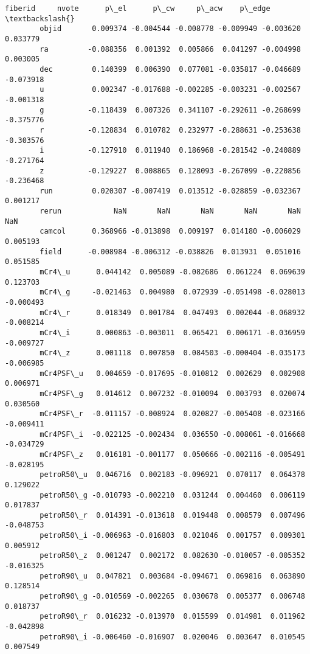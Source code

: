 \documentclass[11pt]{article}
\begin{document}
\begin{Verbatim}[commandchars=\\\{\}]
                     fiberid     nvote      p\_el      p\_cw     p\_acw    p\_edge  \textbackslash{}
        objid       0.009374 -0.004544 -0.008778 -0.009949 -0.003620  0.033779   
        ra         -0.088356  0.001392  0.005866  0.041297 -0.004998  0.003005   
        dec         0.140399  0.006390  0.077081 -0.035817 -0.046689 -0.073918   
        u           0.002347 -0.017688 -0.002285 -0.003231 -0.002567 -0.001318   
        g          -0.118439  0.007326  0.341107 -0.292611 -0.268699 -0.375776   
        r          -0.128834  0.010782  0.232977 -0.288631 -0.253638 -0.303576   
        i          -0.127910  0.011940  0.186968 -0.281542 -0.240889 -0.271764   
        z          -0.129227  0.008865  0.128093 -0.267099 -0.220856 -0.236468   
        run         0.020307 -0.007419  0.013512 -0.028859 -0.032367  0.001217   
        rerun            NaN       NaN       NaN       NaN       NaN       NaN   
        camcol      0.368966 -0.013898  0.009197  0.014180 -0.006029  0.005193   
        field      -0.008984 -0.006312 -0.038826  0.013931  0.051016  0.051585   
        mCr4\_u      0.044142  0.005089 -0.082686  0.061224  0.069639  0.123703   
        mCr4\_g     -0.021463  0.004980  0.072939 -0.051498 -0.028013 -0.000493   
        mCr4\_r      0.018349  0.001784  0.047493  0.002044 -0.068932 -0.008214   
        mCr4\_i      0.000863 -0.003011  0.065421  0.006171 -0.036959 -0.009727   
        mCr4\_z      0.001118  0.007850  0.084503 -0.000404 -0.035173 -0.006985   
        mCr4PSF\_u   0.004659 -0.017695 -0.010812  0.002629  0.002908  0.006971   
        mCr4PSF\_g   0.014612  0.007232 -0.010094  0.003793  0.020074  0.030560   
        mCr4PSF\_r  -0.011157 -0.008924  0.020827 -0.005408 -0.023166 -0.009411   
        mCr4PSF\_i  -0.022125 -0.002434  0.036550 -0.008061 -0.016668 -0.034729   
        mCr4PSF\_z   0.016181 -0.001177  0.050666 -0.002116 -0.005491 -0.028195   
        petroR50\_u  0.046716  0.002183 -0.096921  0.070117  0.064378  0.129022   
        petroR50\_g -0.010793 -0.002210  0.031244  0.004460  0.006119  0.017837   
        petroR50\_r  0.014391 -0.013618  0.019448  0.008579  0.007496 -0.048753   
        petroR50\_i -0.006963 -0.016803  0.021046  0.001757  0.009301  0.005912   
        petroR50\_z  0.001247  0.002172  0.082630 -0.010057 -0.005352 -0.016325   
        petroR90\_u  0.047821  0.003684 -0.094671  0.069816  0.063890  0.128514   
        petroR90\_g -0.010569 -0.002265  0.030678  0.005377  0.006748  0.018737   
        petroR90\_r  0.016232 -0.013970  0.015599  0.014981  0.011962 -0.042898   
        petroR90\_i -0.006460 -0.016907  0.020046  0.003647  0.010545  0.007549   

\end{Verbatim}
\end{document}

